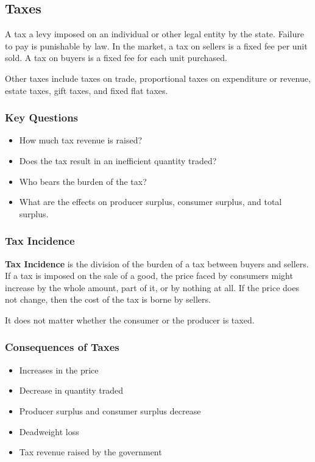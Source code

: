 \documentclass{article}
\begin{document}
\subsection{Taxes}
A tax a levy imposed on an individual or other legal entity by the state.
Failure to pay is punishable by law. In the market, a tax on sellers is a fixed
fee per unit sold. A tax on buyers is a fixed fee for each unit purchased. \par
Other taxes include taxes on trade, proportional taxes on expenditure or
revenue, estate taxes, gift taxes, and fixed flat taxes.

\subsubsection{Key Questions}
\begin{itemize}
  \item How much tax revenue is raised?
  \item Does the tax result in an inefficient quantity traded?
  \item Who bears the burden of the tax?
  \item What are the effects on producer surplus, consumer surplus, and total
  surplus.
\end{itemize}

\subsubsection{Tax Incidence}
\textbf{Tax Incidence} is the division of the burden of a tax between buyers
and sellers. If a tax is imposed on the sale of a good, the price faced by
consumers might increase by the whole amount, part of it, or by nothing at all.
If the price does not change, then the cost of the tax is borne by sellers. \par
It does not matter whether the consumer or the producer is taxed.

\subsubsection{Consequences of Taxes}
\begin{itemize}
  \item Increases in the price
  \item Decrease in quantity traded
  \item Producer surplus and consumer surplus decrease
  \item Deadweight loss
  \item Tax revenue raised by the government
\end{itemize}
\end{document}
